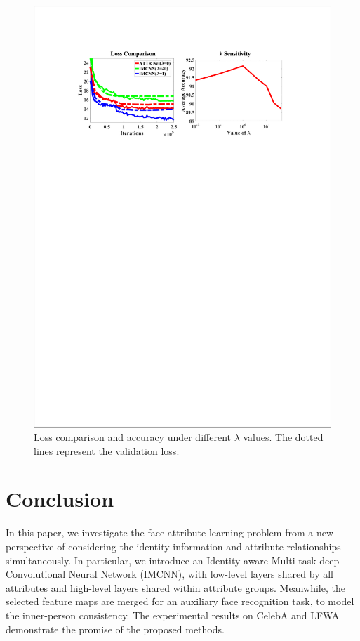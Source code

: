 \documentclass[wcp]{jmlr}
\begin{document}
	\begin{figure}[htb]
		\begin{center}
			\centering\includegraphics[width=16cm]{./new_imgs/LossAndSensitivity_crop.pdf}
		\end{center}
		\caption{Loss comparison and accuracy under different $\lambda$ values. The dotted lines represent the validation loss.}
		\label{Loss}
	\end{figure}
	
	\section{Conclusion}
	In this paper, we investigate the face attribute learning problem from a new perspective of considering the identity information and attribute relationships simultaneously. In particular, we introduce an Identity-aware Multi-task deep Convolutional Neural Network (IMCNN), with low-level layers shared by all attributes and high-level layers shared within attribute groups. Meanwhile, the selected feature maps are merged for an auxiliary face recognition task, to model the inner-person consistency. The experimental results on CelebA and LFWA demonstrate the promise of the proposed methods.
	
	
	
\end{document}
